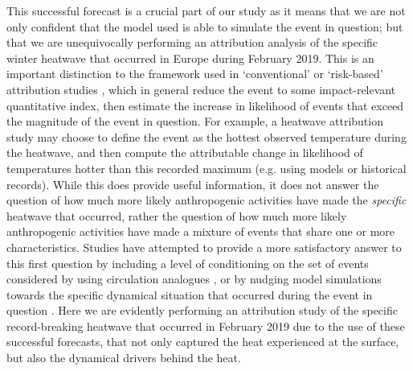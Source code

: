     This successful forecast is a crucial part of our study as it means that we are not only confident that the model used is able to simulate the event in question; but that we are unequivocally performing an attribution analysis of the specific winter heatwave that occurred in Europe during February 2019. This is an important distinction to the framework used in `conventional' or `risk-based' \citep{shepherd_common_2016} attribution studies \citep{stott_human_2004,pall_anthropogenic_2011,sparrow_attributing_2018,leach_anthropogenic_2020}, which in general reduce the event to some impact-relevant quantitative index, then estimate the increase in likelihood of events that exceed the magnitude of the event in question. For example, a heatwave attribution study may choose to define the event as the hottest observed temperature during the heatwave, and then compute the attributable change in likelihood of temperatures hotter than this recorded maximum (e.g. using models or historical records). While this does provide useful information, it does not answer the question of how much more likely anthropogenic activities have made the \emph{specific} heatwave that occurred, rather the question of how much more likely anthropogenic activities have made a mixture of events that share one or more characteristics. Studies have attempted to provide a more satisfactory answer to this first question by including a level of conditioning on the set of events considered by using circulation analogues \citep{yiou_statistical_2017}, or by nudging model simulations towards the specific dynamical situation that occurred during the event in question \citep{meredith_crucial_2015,van_garderen_methodology_2021}. Here we are evidently performing an attribution study of the specific record-breaking heatwave that occurred in February 2019 due to the use of these successful forecasts, that not only captured the heat experienced at the surface, but also the dynamical drivers behind the heat.

